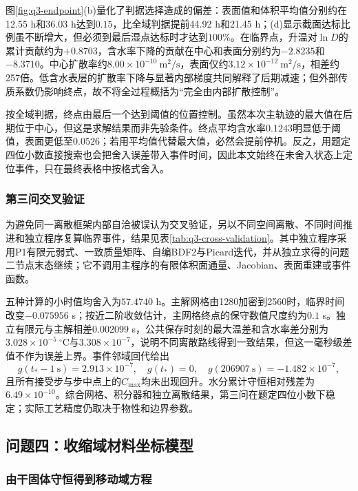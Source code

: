图\ref{fig:q3-endpoint}(b)量化了判据选择造成的偏差：表面值和体积平均值分别约在12.55 h和36.03 h达到$0.15$，比全域判据提前44.92 h和21.45 h；(d)显示截面达标比例虽不断增大，但必须到最后湿点达标时才达到$100\%$。在临界点，升温对$\ln D$的累计贡献约为$+0.8703$，含水率下降的贡献在中心和表面分别约为$-2.8235$和$-8.3710$。中心扩散率约$8.00\times10^{-10}\ \mathrm{m^2/s}$，表面仅约$3.12\times10^{-12}\ \mathrm{m^2/s}$，相差约257倍。低含水表层的扩散率下降与显著内部梯度共同解释了后期减速；但外部传质系数仍影响终点，故不将全过程概括为“完全由内部扩散控制”。

按全域判据，终点由最后一个达到阈值的位置控制。虽然本次主轨迹的最大值在后期位于中心，但这是求解结果而非先验条件。终点平均含水率$0.1243$明显低于阈值，表面更低至$0.0526$；若用平均值代替最大值，必然会提前停机。反之，用题定四位小数直接搜索也会把舍入误差带入事件时间，因此本文始终在未舍入状态上定位事件，只在最终表格中按格式舍入。

\subsubsection{第三问交叉验证}

为避免同一离散框架内部自洽被误认为交叉验证，另以不同空间离散、不同时间推进和独立程序复算临界事件，结果见表\ref{tab:q3-cross-validation}。其中独立程序采用P1有限元弱式、一致质量矩阵、自编BDF2与Picard迭代，并从独立求得的问题二节点末态继续；它不调用主程序的有限体积面通量、Jacobian、表面重建或事件函数。



五种计算的小时值均舍入为$57.4740$ h。主解网格由1280加密到2560时，临界时间改变$-0.075956$ s；按近二阶收敛估计，主网格终点的保守数值尺度约为$0.1$ s。独立有限元与主解相差$0.002099$ s，公共保存时刻的最大温差和含水率差分别为$3.028\times10^{-5}\ ^\circ\mathrm C$与$3.308\times10^{-7}$，说明不同离散路线得到一致结果，但这一毫秒级差值不作为误差上界。事件邻域回代给出
\[
g(t_*-1\ \mathrm{s})=2.913\times10^{-7},\quad
g(t_*)=0,\quad
g(206907\ \mathrm{s})=-1.482\times10^{-7},
\]
且所有接受步与步中点上的$C_{\max}$均未出现回升。水分累计守恒相对残差为$6.49\times10^{-10}$。综合网格、积分器和独立离散结果，第三问在题定四位小数下稳定；实际工艺精度仍取决于物性和边界参数。

\subsection{问题四：收缩域材料坐标模型}

\subsubsection{由干固体守恒得到移动域方程}

